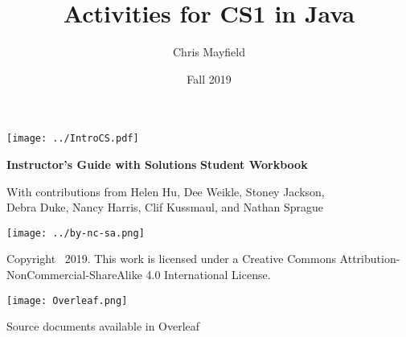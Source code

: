 \documentclass[12pt,twoside,openright]{report}
\title{Activities for CS1 in Java}
\author{Chris Mayfield}
\date{Fall 2019}
\begin{document}
\setcounter{page}{1}

\begin{titlepage}
\null\vfill
\centering

\texttt{[image: ../IntroCS.pdf]}

\makeatletter

\vspace*{4em}
\huge \textbf{\@title}

\vspace*{2pt}
\ifdefined\Teacher
\color{DarkRed}
\Large \textbf{Instructor's Guide with Solutions}
\else
\color{ForestGreen}
\Large \textbf{Student Workbook}
\fi
\normalcolor

\vspace*{2em}
\large \@author

\vspace*{4pt}
\small With contributions from Helen Hu, Dee Weikle, Stoney Jackson, \\ Debra Duke, Nancy Harris, Clif Kussmaul, and Nathan Sprague

\vspace*{2em}
\Large \@date

\makeatother

\normalsize

\vspace*{4em}
\texttt{[image: ../by-nc-sa.png]}

\vspace*{1ex}
Copyright \textcopyright\ 2019.
This work is licensed under a Creative Commons Attribution-NonCommercial-ShareAlike 4.0 International License.

\ifdefined\Teacher
\vspace*{2em}
\texttt{[image: Overleaf.png]}

\vspace*{1ex}
Source documents available in Overleaf
\fi

\vfill\null
\end{titlepage}

\cleardoublepage
{}


\cleardoublepage
{}
\tableofcontents
{}
\cleardoublepage

\pagestyle{plain}
\setcounter{page}{1}

\newcommand{\mod}[1]{\hspace*{1.5em}Model~#1~~}
\end{document}
